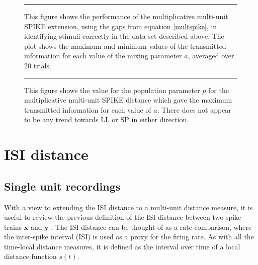%
%
\begin{figure}[htb]

\bigskip
\rule{35em}{0.5pt}
\caption{This figure shows the performance of the multiplicative multi-unit SPIKE extension, using the gaps from equation \ref{multspike}, in identifying stimuli correctly in the data set described above.  The plot shows the maximum and minimum values of the transmitted information for each value of the mixing parameter $a$, averaged over 20 trials.}
\end{figure}

\begin{figure}[htb]

\bigskip
\rule{35em}{0.5pt}
\caption{This figure shows the value for the population parameter $p$ for the multiplicative multi-unit SPIKE distance which gave the maximum transmitted information for each value of $a$.  There does not appear to be any trend towards LL or SP in either direction.}
\end{figure}

\newpage
\section{ISI distance}
\bigskip
\subsection{Single unit recordings}

With a view to extending the ISI distance to a multi-unit distance measure, it is useful to review the previous definition of the ISI distance between two spike trains $\mathbf{x}$ and $\mathbf{y}$ .  The ISI distance can be thought of as a rate-comparison, where the inter-spike interval (ISI) is used as a proxy for the firing rate.  As with all the time-local distance measures, it is defined as the interval over time of a local distance function $s(t)$.

